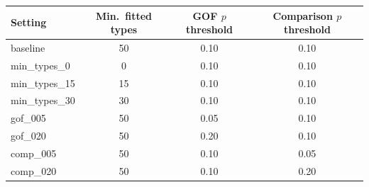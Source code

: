 \begin{tabular}{lccc}
\toprule
Setting & Min.\ fitted types & GOF $p$ threshold & Comparison $p$ threshold \\
\midrule
baseline & 50 & 0.10 & 0.10 \\
min\_types\_0 & 0 & 0.10 & 0.10 \\
min\_types\_15 & 15 & 0.10 & 0.10 \\
min\_types\_30 & 30 & 0.10 & 0.10 \\
gof\_005 & 50 & 0.05 & 0.10 \\
gof\_020 & 50 & 0.20 & 0.10 \\
comp\_005 & 50 & 0.10 & 0.05 \\
comp\_020 & 50 & 0.10 & 0.20 \\
\bottomrule
\end{tabular}
